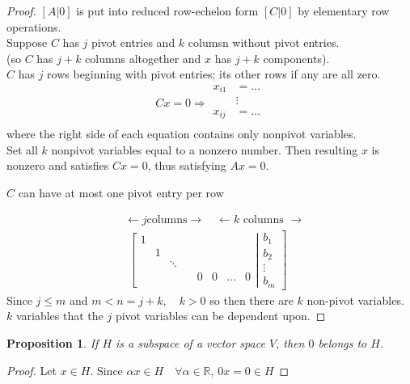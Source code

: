 \documentclass[twoside]{amsart}
\theoremstyle{plain}
\newtheorem{proposition}{Proposition}
\theoremstyle{definition}
\begin{document}
\begin{proof}
$[A|0]$ is put into reduced row-echelon form $[C|0]$ by elementary row operations.  \\
Suppose $C$ has $j$ pivot entries and $k$ columsn without pivot entries.  \\
\phantom{ Suppos}(so $C$ has $j+k$ columns altogether and $x$ has $j+k$ components).  \\

$C$ has $j$ rows beginning with pivot entries; its other rows if any are all zero.  
\[
Cx = 0 \Longrightarrow \begin{aligned} x_{i1} & = \dots \\ & \vdots \\ x_{ij} & = \dots \\ \end{aligned}
\]
where the right side of each equation contains only nonpivot variables.  \bigskip \\
Set all $k$ nonpivot variables equal to a nonzero number.  Then resulting $x$ is nonzero and satisfies $Cx=0$, thus satisfying $Ax=0$.  

\small
$C$ can have at most one pivot entry per row 

\begin{align*}
&\xleftarrow{}j\text{columns}\xrightarrow{} \quad \xleftarrow{} k \text{ columns  } \xrightarrow{} \\
& \, \, \left[
\begin{matrix}
1 &   &        &   &       & \\
  & 1 &        &   &       & \\
  &   & \ddots &   &       & \\
  &   &   & \quad 0  & 0 & \dots & 0 \\ \end{matrix} \right| \left. \begin{matrix} b_1 \\ b_2 \\ \vdots \\ b_m  
\end{matrix}
\right]
\end{align*}
\small
\noindent Since $j \leq m $ and $m <n = j+k, \quad k>0$ so then there are $k$ non-pivot variables.  \\
\phantom{Sinc} $k$ variables that the $j$ pivot variables can be dependent upon.  
\end{proof}

\normalsize

\begin{proposition}\label{P:Identity_subspace}
If $H$ is a subspace of a vector space $V$, then $0$ belongs to $H$.  
\end{proposition}
\begin{proof}
Let $x \in H$.  Since $\alpha x \in H \quad \forall \alpha \in \mathbb{R} $, \quad $ 0 x = 0 \in H$
\end{proof}
\end{document}
